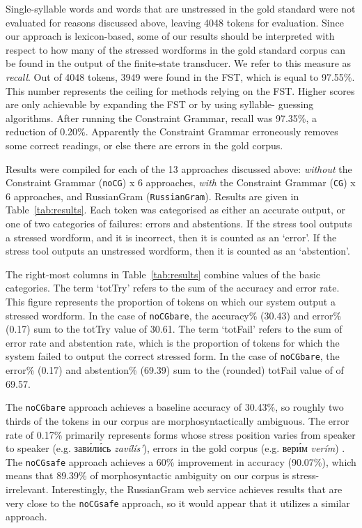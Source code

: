 \documentclass[11pt]{article}
\newcommand{\rus}[1]{\foreignlanguage{russian}{#1}}
\newcommand{\rr}[1]{\marginpar{\scriptsize R: #1}} %
\begin{document}
Single-syllable words and words that are unstressed in the gold standard were
not evaluated for reasons discussed above, leaving 4048 tokens for evaluation.
Since our approach is lexicon-based, some of our results should be interpreted
with respect to how many of the stressed wordforms in the gold standard corpus
can be found in the output of the finite-state transducer. We refer to this 
measure as \emph{recall}. Out of 4048 tokens, 3949 were 
found in the FST, which is equal to 97.55\%.
This number represents the ceiling for methods relying on the FST.
Higher scores are only achievable by expanding the FST or by using syllable-
guessing algorithms. After running the Constraint Grammar, recall was 97.35\%, 
a reduction of 0.20\%. Apparently the Constraint Grammar erroneously removes some 
correct readings, or else there are errors in the gold corpus.

Results were compiled for each of the 13 approaches discussed above: 
\emph{without} the Constraint Grammar ({\small {\tt noCG}}) x 6 approaches, 
\emph{with} the Constraint Grammar ({\small {\tt CG}}) x 6 approaches, 
and RussianGram ({\small {\tt RussianGram}}). Results are given in 
Table~\ref{tab:results}. Each token was categorised as either an accurate output, 
or one of two categories of failures: errors and abstentions. 
If the stress tool outputs a stressed wordform, and it is incorrect, then it is
counted as an `error'. If the stress tool outputs an unstressed wordform, then
it is counted as an `abstention'.

The right-most columns in 
Table~\ref{tab:results} combine values of the basic categories. The term `totTry' 
refers to the sum of the accuracy and error rate. This figure represents the 
proportion of tokens on which our system output a stressed wordform. In the case 
of {\small {\tt noCGbare}}, the accuracy\% (30.43) and error\% (0.17) sum to the 
totTry value of 30.61. The term `totFail' refers to the sum of error rate 
and abstention rate, which is the 
proportion of tokens for which the system failed to output the correct stressed 
form. In the case of {\small {\tt noCGbare}}, the error\% (0.17) 
and abstention\% (69.39) sum to the (rounded) totFail value of of 69.57. 

\rr{Are differences significant?}

The {\small {\tt noCGbare}} approach achieves a baseline accuracy of
30.43\%, so roughly two thirds of the tokens in our corpus are
morphosyntactically ambiguous. The error rate of 0.17\% primarily represents 
forms whose stress position varies from speaker to speaker (e.g.
\rus{зав\'{и}л\'{и}сь} \emph{zav\'{i}l\'{i}s'}), errors in the gold corpus (e.g. 
\rus{вер\'{и}м} \emph{ver\'{i}m}) . The {\small {\tt noCGsafe}} approach
achieves a 60\% improvement in accuracy (90.07\%), which means that 89.39\% of 
morphosyntactic ambiguity on our corpus is stress-irrelevant. Interestingly, the 
RussianGram web service achieves results that are very close 
to the {\small {\tt noCGsafe}} approach, so it would appear that it 
utilizes a similar approach.
\end{document}
